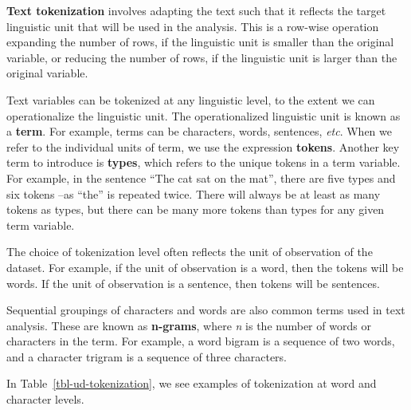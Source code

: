 \documentclass[
  letterpaper,
]{latex/krantz}
\theoremstyle{definition}
\theoremstyle{remark}
\begin{document}
\textbf{Text tokenization} involves adapting the text such that it
reflects the target linguistic unit that will be used in the analysis.
This is a row-wise operation expanding the number of rows, if the
linguistic unit is smaller than the original variable, or reducing the
number of rows, if the linguistic unit is larger than the original
variable.

Text variables can be tokenized at any linguistic level, to the extent
we can operationalize the linguistic unit. The operationalized
linguistic unit is known as a \textbf{term}. For example, terms can be
characters, words, sentences, \emph{etc}. When we refer to the
individual units of term, we use the expression \textbf{tokens}. Another
key term to introduce is \textbf{types}, which refers to the unique
tokens in a term variable. For example, in the sentence ``The cat sat on
the mat'', there are five types and six tokens --as ``the'' is repeated
twice. There will always be at least as many tokens as types, but there
can be many more tokens than types for any given term variable.

The choice of tokenization level often reflects the unit of observation
of the dataset. For example, if the unit of observation is a word, then
the tokens will be words. If the unit of observation is a sentence, then
tokens will be sentences.

Sequential groupings of characters and words are also common terms used
in text analysis. These are known as \textbf{n-grams}, where \emph{n} is
the number of words or characters in the term. For example, a word
bigram is a sequence of two words, and a character trigram is a sequence
of three characters.

In Table~\ref{tbl-ud-tokenization}, we see examples of tokenization at
word and character levels.
\end{document}
